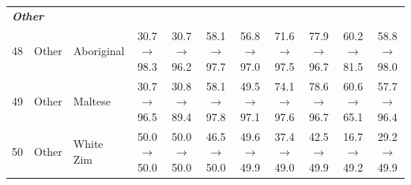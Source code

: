 \begin{table}[t]
{\begin{tabular}{rll c c c c c c c c}
\midrule
\multicolumn{11}{l}{\textit{\textbf{Other}}} \\
48 & Other & Aboriginal & 30.7$\rightarrow$98.3 & 30.7$\rightarrow$96.2 & 58.1$\rightarrow$97.7 & 56.8$\rightarrow$97.0 & 71.6$\rightarrow$97.5 & 77.9$\rightarrow$96.7 & 60.2$\rightarrow$81.5 & 58.8$\rightarrow$98.0 \\
49 & Other & Maltese & 30.7$\rightarrow$96.5 & 30.8$\rightarrow$89.4 & 58.1$\rightarrow$97.8 & 49.5$\rightarrow$97.1 & 74.1$\rightarrow$97.6 & 78.6$\rightarrow$96.7 & 60.6$\rightarrow$65.1 & 57.7$\rightarrow$96.4 \\
50 & Other & White Zim & 50.0$\rightarrow$50.0 & 50.0$\rightarrow$50.0 & 46.5$\rightarrow$50.0 & 49.6$\rightarrow$49.9 & 37.4$\rightarrow$49.0 & 42.5$\rightarrow$49.9 & 16.7$\rightarrow$49.2 & 29.2$\rightarrow$49.9 \\
\bottomrule
\end{tabular}
}
\end{table}
